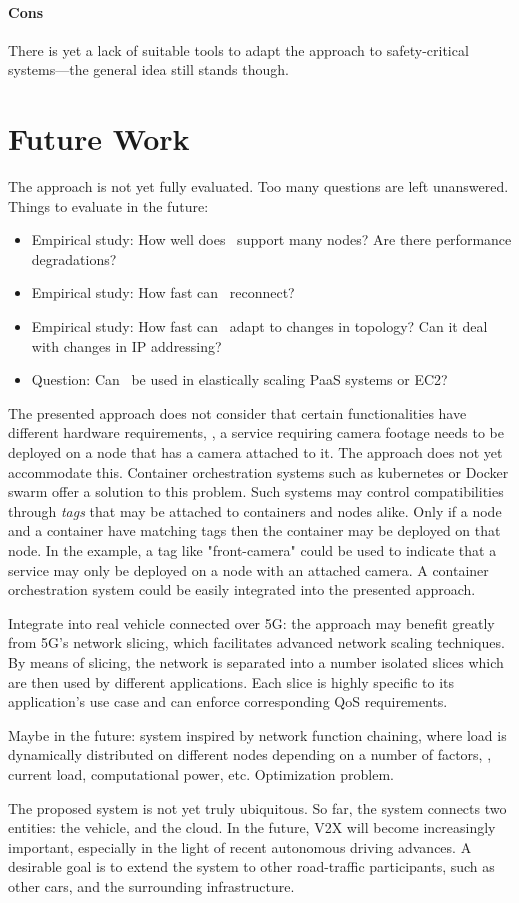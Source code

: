 \paragraph{Cons}


There is yet a lack of suitable tools to adapt the approach to safety-critical systems---the general idea still stands though.

\section{Future Work}

The approach is not yet fully evaluated. Too many questions are left unanswered. Things to evaluate in the future:
\begin{itemize}
	\item Empirical study: How well does \wnet\ support many nodes? Are there performance degradations?
	\item Empirical study: How fast can \wnet\ reconnect?
	\item Empirical study: How fast can \wnet\ adapt to changes in topology? Can it deal with changes in IP addressing?
	\item Question: Can \weave\ be used in elastically scaling PaaS systems or EC2?
\end{itemize}



The presented approach does not consider that certain functionalities have different hardware requirements, \ie , a service requiring camera footage needs to be deployed on a node that has a camera attached to it. The approach does not yet accommodate this. Container orchestration systems such as kubernetes or Docker swarm offer a solution to this problem. Such systems may control compatibilities through \emph{tags} that may be attached to containers and nodes alike. Only if a node and a container have matching tags then the container may be deployed on that node. In the example, a tag like "front-camera" could be used to indicate that a service may only be deployed on a node with an attached camera. A container orchestration system could be easily integrated into the presented approach. 

Integrate into real vehicle connected over 5G: the approach may benefit greatly from 5G's network slicing, which facilitates advanced network scaling techniques. By means of slicing, the network is separated into a number isolated slices which are then used by different applications. Each slice is highly specific to its application's use case and can enforce corresponding QoS requirements.

Maybe in the future: system inspired by network function chaining, where load is dynamically distributed on different nodes depending on a number of factors, \eg , current load, computational power, etc. Optimization problem.

The proposed system is not yet truly ubiquitous. So far, the system connects two entities: the vehicle, and the cloud. In the future, V2X will become increasingly important, especially in the light of recent autonomous driving advances. A desirable goal is to extend the system to other road-traffic participants, such as other cars, and the surrounding infrastructure. 